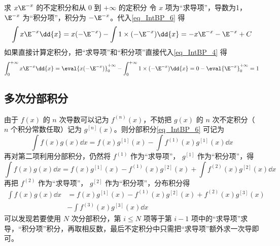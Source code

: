 \begin{example}{求 $x \E^{ - x}$ 的不定积分和从 $0$ 到 $+\infty$ 的定积分}
令 $x$ 项为“求导项”，导数为1， $\E^{ - x}$ 为“积分项”，积分为 $-\E^{ - x}$。代入\autoref{eq_IntBP_6} 得
\begin{equation}
\int x \E^{ - x} \dd{x}  = x(-\E^{ - x}) - \int 1 \times (-\E^{ - x}) \dd{x}  =  - x \E^{ - x} - \E^{ - x} + C
\end{equation}
如果直接计算定积分，把“求导项”和“积分项”直接代入\autoref{eq_IntBP_4} 得
\begin{equation}
\int_0^{+\infty} x \E^{-x} \dd{x}  = \eval{ x( - \E^{-x}) }_0^{ + \infty } - \int_0^{+\infty} 1 \times (-\E^{-x}) \dd{x}  = 0 - \eval{ \E^{-x} }_0^{+\infty} = 1
\end{equation}
\end{example}

\subsection{多次分部积分}
由于 $f(x)$ 的 $n$ 次导数可以记为 $f^{(n)}(x)$，不妨把 $g(x)$ 的 $n$ 次不定积分（ $n$ 个积分常数任取）记为 $g^{[n]}(x)$。则分部积分\autoref{eq_IntBP_6} 可记为
\begin{equation}
\int f(x)g(x) \dd{x}  = f(x) g^{[1]}(x) - \int f^{(1)}(x) g^{[1]}(x) \dd{x}
\end{equation}
再对第二项利用分部积分，仍然将 $f^{(1)}$ 作为“求导项”， $g^{[1]}$ 作为“积分项”，得
\begin{equation}
\int f(x)g(x) \dd{x}  = f(x) g^{[1]}(x) - f^{(1)}(x) g^{[2]}(x) + \int f^{(2)}(x) g^{[2]}(x) \dd{x}
\end{equation}
再把 $f^{(2)}$ 作为“求导项”， $g^{[2]}$ 作为“积分项”，分布积分得
\begin{equation}
\begin{aligned}
\int f(x)g(x) \dd{x} &= f(x) g^{[1]}(x) - f^{(1)}(x) g^{[2]}(x) + f^{(2)}(x)g^{[3]}(x) \\
&- \int f^{(3)}(x) g^{[3]}(x) \dd{x}
\end{aligned}
\end{equation}
可以发现若要使用 $N$ 次分部积分，第 $i \leqslant N$ 项等于第 $i-1$ 项中的“求导项”求导，“积分项”积分，再取相反数，最后不定积分中只需把“求导项”额外求一次导即可。 

